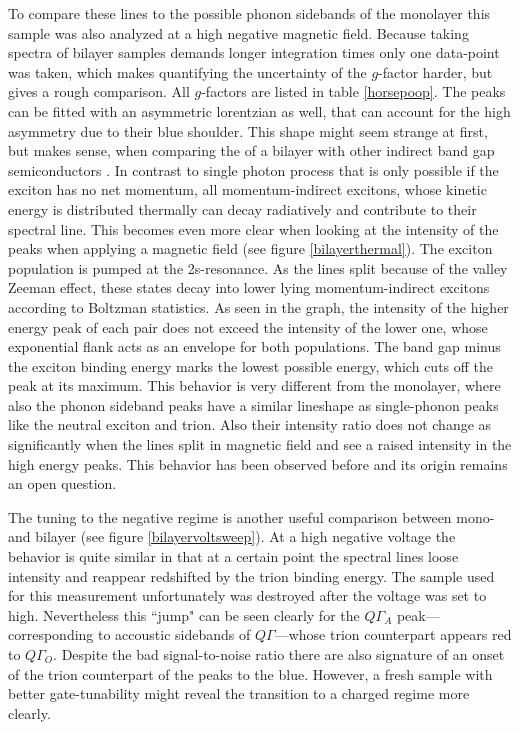 To compare these lines to the possible phonon sidebands of the monolayer this sample was also analyzed at a high negative magnetic field. Because taking spectra of bilayer samples demands longer integration times only one data-point was taken, which makes quantifying the uncertainty of the $g$-factor harder, but gives a rough comparison. All $g$-factors are listed in table \ref{horsepoop}. The peaks can be fitted with an asymmetric lorentzian as well, that can account for the high asymmetry due to their blue shoulder. This shape might seem strange at first, but makes sense, when comparing the \pl of a \wse bilayer with other indirect band gap semiconductors \cite{pelant_luminescence_2012}. In contrast to single photon process that is only possible if the exciton has no net momentum, all momentum-indirect excitons, whose kinetic energy is distributed thermally can decay radiatively and contribute to their spectral line. This becomes even more clear when looking at the intensity of the peaks when applying a magnetic field (see figure \ref{bilayerthermal}). The exciton population is pumped at the 2s-resonance. As the lines split because of the valley Zeeman effect, these states decay into lower lying momentum-indirect excitons according to Boltzman statistics. As seen in the graph, the intensity of the higher energy peak of each pair does not exceed the intensity of the lower one, whose exponential flank acts as an envelope for both populations. The band gap minus the exciton binding energy marks the lowest possible energy, which cuts off the peak at its maximum. This behavior is very different from the monolayer, where also the phonon sideband peaks have a similar lineshape as single-phonon peaks like the neutral exciton and trion. Also their intensity ratio does not change as significantly when the lines split in magnetic field and see a raised intensity in the high energy peaks. This behavior has been observed before and its origin remains an open question\cite{koperski_optical_2017}.

The tuning to the negative regime is another useful comparison between mono- and bilayer \wse (see figure \ref{bilayervoltsweep}). At a high negative voltage the behavior is quite similar in that at a certain point the spectral lines loose intensity and reappear redshifted by the trion binding energy. The sample used for this measurement unfortunately was destroyed after the voltage was set to high. Nevertheless this ``jump" can be seen clearly for the $Q\Gamma_A$ peak---corresponding to accoustic sidebands of $Q\Gamma$---whose trion counterpart appears red to $Q\Gamma_O$. Despite the bad signal-to-noise ratio there are also signature of an onset of the trion counterpart of the peaks to the blue. However, a fresh sample with better gate-tunability might reveal the transition to a charged regime more clearly. 
